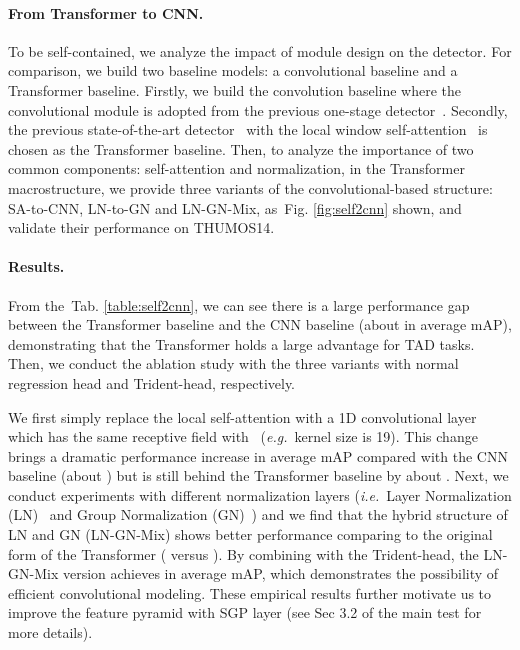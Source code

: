 \documentclass[10pt,twocolumn,letterpaper]{article}
\def\ie{{\em i.e.}}
\def\eg{{\em e.g.}}
\newcommand{\figref}[1]{Fig. \ref{#1}}
\newcommand{\tabref}[1]{Tab. \ref{#1}}
\begin{document}
\paragraph{From Transformer to CNN.}
To be self-contained, we analyze the impact of module design on the detector. 
For comparison, we build two baseline models: a convolutional baseline and a Transformer baseline. Firstly, we build the convolution baseline where the convolutional module is adopted from the previous one-stage detector~\cite{lin2021learning,zhang2022actionformer}. Secondly, the previous state-of-the-art detector~\cite{zhang2022actionformer} with the local window self-attention~\cite{beltagy2020longformer} is chosen as the Transformer baseline. Then, to analyze the importance of two common components: self-attention and normalization, in the Transformer~\cite{vaswani2017attention} macrostructure, we provide three variants of the convolutional-based structure: SA-to-CNN, LN-to-GN and LN-GN-Mix, as~\figref{fig:self2cnn} shown, and validate their performance on THUMOS14. 

\paragraph{Results.}
From the~\tabref{table:self2cnn}, we can see there is a large performance gap between the Transformer baseline and the CNN baseline (about  in average mAP), demonstrating that the Transformer holds a large advantage for TAD tasks. 
Then, we conduct the ablation study with the three variants with normal regression head and Trident-head, respectively.

We first simply replace the local self-attention with a 1D convolutional layer which has the same receptive field with~\cite{zhang2022actionformer} (\eg~kernel size is 19). This change brings a dramatic performance increase in average mAP compared with the CNN baseline (about ) but is still behind the Transformer baseline by about . Next, we conduct experiments with different normalization layers (\ie~Layer Normalization (LN)~\cite{ba2016layer} and Group Normalization (GN)~\cite{wu2018group}) and we find that the hybrid structure of LN and GN (LN-GN-Mix) shows better performance comparing to the original form of the Transformer ( versus ). 
By combining with the Trident-head, the LN-GN-Mix version achieves  in average mAP, which demonstrates the possibility of efficient convolutional modeling. These empirical results further motivate us to improve the feature pyramid with SGP layer (see Sec 3.2 of the main test for more details).
\end{document}
